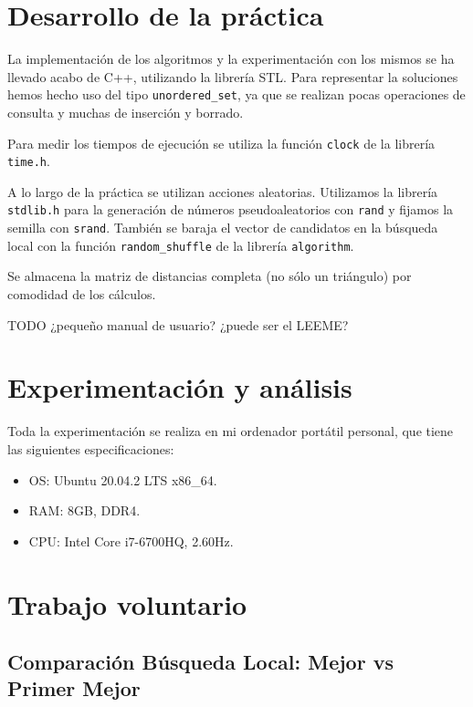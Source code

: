 \documentclass{article}
\begin{document}
\pagebreak

\section{Desarrollo de la práctica}

La implementación de los algoritmos y la experimentación con los mismos se ha llevado acabo de C++, utilizando la librería STL. 
Para representar la soluciones hemos hecho uso del tipo \texttt{unordered\_set}, ya que se realizan pocas operaciones de consulta y
muchas de inserción y borrado.

Para medir los tiempos de ejecución se utiliza la función \texttt{clock} de la librería \texttt{time.h}.

A lo largo de la práctica se utilizan acciones aleatorias. Utilizamos la librería \texttt{stdlib.h} para la generación de
números pseudoaleatorios con \texttt{rand} y fijamos la semilla con \texttt{srand}. También se baraja el vector de candidatos
en la búsqueda local con la función \texttt{random\_shuffle} de la librería \texttt{algorithm}.

Se almacena la matriz de distancias completa (no sólo un triángulo) por comodidad de los cálculos.

TODO ¿pequeño manual de usuario? ¿puede ser el LEEME?

\pagebreak

\section{Experimentación y análisis}

Toda la experimentación se realiza en mi ordenador portátil personal, que tiene las siguientes especificaciones:
\begin{itemize}
	\item OS: Ubuntu 20.04.2 LTS x86\_64.
	\item RAM: 8GB, DDR4.
	\item CPU: Intel Core i7-6700HQ, 2.60Hz.
\end{itemize}

\section{Trabajo voluntario}

\subsection{Comparación Búsqueda Local: Mejor vs Primer Mejor}
\end{document}
